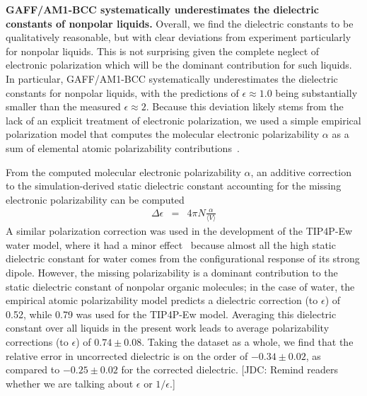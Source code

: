 \documentclass[aip, jcp, reprint]{revtex4-1}  %
\begin{document}

{\bf GAFF/AM1-BCC systematically underestimates the dielectric constants of nonpolar liquids.}
Overall, we find the dielectric constants to be qualitatively reasonable, but with clear deviations from experiment particularly for nonpolar liquids. 
This is not surprising given the complete neglect of electronic polarization which will be the dominant contribution for such liquids.
In particular, GAFF/AM1-BCC systematically underestimates the dielectric constants for nonpolar liquids, with the predictions of $\epsilon \approx 1.0 $ being substantially smaller than the measured $\epsilon \approx 2$.  
Because this deviation likely stems from the lack of an explicit treatment of electronic polarization, we used a simple empirical polarization model that computes the molecular electronic polarizability $\alpha$ as a sum of elemental atomic polarizability contributions~\cite{bosque2002polarizabilities}.


From the computed molecular electronic polarizability $\alpha$, an additive correction to the simulation-derived static dielectric constant accounting for the missing electronic polarizability can be computed~\cite{horn2004}
\begin{eqnarray}
\Delta \epsilon &=& 4 \pi N  \frac{\alpha}{\langle V \rangle} \label{equation:dielectric correction}
\end{eqnarray}
A similar polarization correction was used in the development of the TIP4P-Ew water model, where it had a minor effect~\cite{horn2004} because almost all the high static dielectric constant for water comes from the configurational response of its strong dipole.  
However, the missing polarizability is a dominant contribution to the static dielectric constant of nonpolar organic molecules;   
in the case of water, the empirical atomic polarizability model predicts a dielectric correction (to $\epsilon$) of 0.52, while 0.79 was used for the TIP4P-Ew model.  
Averaging this dielectric constant over all liquids in the present work leads to average polarizability corrections (to $\epsilon$) of $0.74 \pm 0.08$. 
Taking the dataset as a whole, we find that the relative error in uncorrected dielectric is on the order of $-0.34 \pm 0.02$, as compared to $-0.25 \pm 0.02$ for the corrected dielectric. {\color{red}[JDC: Remind readers whether we are talking about $\epsilon$ or $1/\epsilon$.]} 
\end{document}
